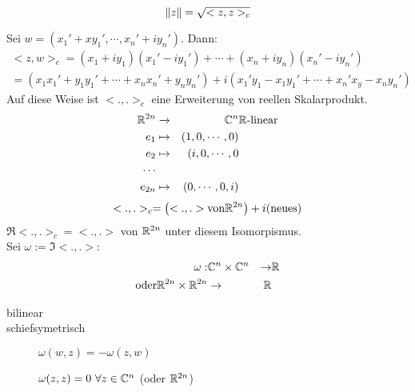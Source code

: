 \begin{Def}
  \[\left\| z \right\|=\sqrt{<z,z>_c}\]
\end{Def}
\begin{Bem}
  Sei $w=(x_1'+xy_1',\cdots,x_n'+iy_n')$. Dann:
  \begin{align*}
    <z,w>_c=(x_1+iy_1)(x_1'-iy_1')+\cdots+(x_n+iy_n)(x_n'-iy_n')\\
    =(x_1x_1'+y_1y_1'+\cdots+x_nx_n'+y_ny_n')+i(x_1'y_1-x_1y_1'+\cdots+x_n'x_y-x_ny_n')
  \end{align*}
  Auf diese Weise ist $<.,.>_c$ eine Erweiterung von reellen Skalarprodukt.
  \begin{align*}
    \mathbb{R}^{2n}&\xrightarrow{~}&\mathbb{C}^n&\mathbb{R}\text{-linear}\\
    e_1&\mapsto&(1,0,\cdots,0)\\
    e_2&\mapsto&(i,0,\cdots,0\\
    \cdots\\
    e_{2n}&\mapsto&(0,\cdots,0,i)
  \end{align*}
  \[<.,.>_c=\left( <.,.> \text{von} \mathbb{R}^{2n} \right) + i(\text{neues})\]
  $\Re<.,.>_c=<.,.>$ von $\mathbb{R}^{2n}$ unter diesem Isomorpismus.\\
  Sei $\omega:=\Im<.,.>$:
  \begin{align*}
    \omega:&\mathbb{C}^n\times\mathbb{C}^n&\to&\mathbb{R}\\
    \text{oder}\mathbb{R}^{2n}\times\mathbb{R}^{2n}&\to&\mathbb{R}
  \end{align*}
\end{Bem}
\begin{Eig}
  \begin{description}
    \item[bilinear]
    \item[schiefsymetrisch] $\omega(w,z)=-\omega(z,w)$
    \item[] $\omega(z,z)=0\ \forall z\in\mathbb{C}^n$ (oder $\mathbb{R}^{2n}$)
  \end{description}
\end{Eig}
